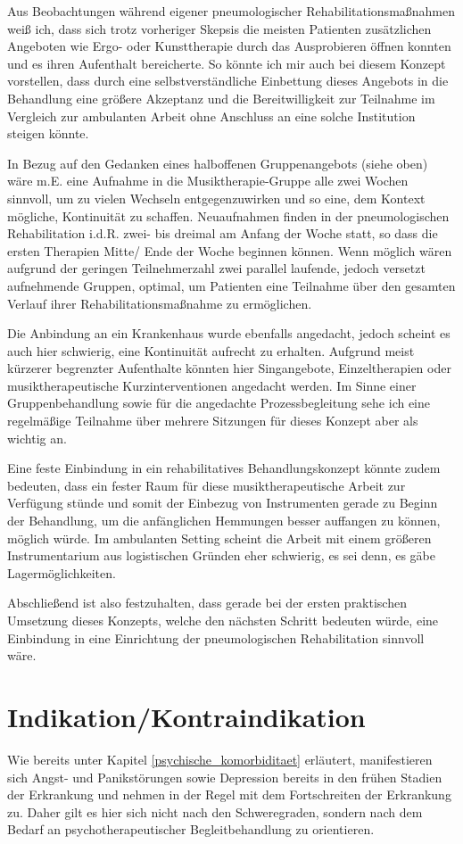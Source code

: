 Aus Beobachtungen während eigener pneumologischer Rehabilitationsmaßnahmen weiß ich, dass sich trotz vorheriger Skepsis die meisten Patienten zusätzlichen Angeboten wie Ergo- oder Kunsttherapie durch das Ausprobieren öffnen konnten und es ihren Aufenthalt bereicherte. So könnte ich mir auch bei diesem Konzept vorstellen, dass durch eine selbstverständliche Einbettung dieses Angebots in die Behandlung eine größere Akzeptanz und die Bereitwilligkeit zur Teilnahme im Vergleich zur ambulanten Arbeit ohne Anschluss an eine solche Institution steigen könnte. 

In Bezug auf den Gedanken eines halboffenen Gruppenangebots (siehe oben) wäre m.E. eine Aufnahme in die Musiktherapie-Gruppe alle zwei Wochen sinnvoll, um zu vielen Wechseln entgegenzuwirken und so eine, dem Kontext mögliche, Kontinuität zu schaffen. Neuaufnahmen finden in der pneumologischen Rehabilitation i.d.R. zwei- bis dreimal am Anfang der Woche statt, so dass die ersten Therapien Mitte/ Ende der Woche beginnen können. Wenn möglich wären aufgrund der geringen Teilnehmerzahl zwei parallel laufende, jedoch versetzt aufnehmende Gruppen, optimal, um Patienten eine Teilnahme über den gesamten Verlauf ihrer Rehabilitationsmaßnahme zu ermöglichen.

Die Anbindung an ein Krankenhaus wurde ebenfalls angedacht, jedoch scheint es auch hier schwierig, eine Kontinuität aufrecht zu erhalten. Aufgrund meist kürzerer begrenzter Aufenthalte könnten hier Singangebote, Einzeltherapien oder musiktherapeutische Kurzinterventionen angedacht werden. Im Sinne einer Gruppenbehandlung sowie für die angedachte Prozessbegleitung sehe ich eine regelmäßige Teilnahme über mehrere Sitzungen für dieses Konzept aber als wichtig an. 

Eine feste Einbindung in ein rehabilitatives Behandlungskonzept könnte zudem bedeuten, dass ein fester Raum für diese musiktherapeutische Arbeit zur Verfügung stünde und somit der Einbezug von Instrumenten gerade zu Beginn der Behandlung, um die anfänglichen Hemmungen besser auffangen zu können, möglich würde. Im ambulanten Setting scheint die Arbeit mit einem größeren Instrumentarium aus logistischen Gründen eher schwierig, es sei denn, es gäbe Lagermöglichkeiten.

Abschließend ist also festzuhalten, dass gerade bei der ersten praktischen Umsetzung dieses Konzepts, welche den nächsten Schritt bedeuten würde, eine Einbindung in eine Einrichtung der pneumologischen Rehabilitation sinnvoll wäre.

\section{Indikation/Kontraindikation}
Wie bereits unter Kapitel \ref{psychische_komorbiditaet} erläutert, manifestieren sich Angst- und Panikstörungen sowie Depression bereits in den frühen Stadien der Erkrankung und nehmen in der Regel mit dem Fortschreiten der Erkrankung zu. Daher gilt es hier sich nicht nach den Schweregraden, sondern nach dem Bedarf an psychotherapeutischer Begleitbehandlung zu orientieren. 

